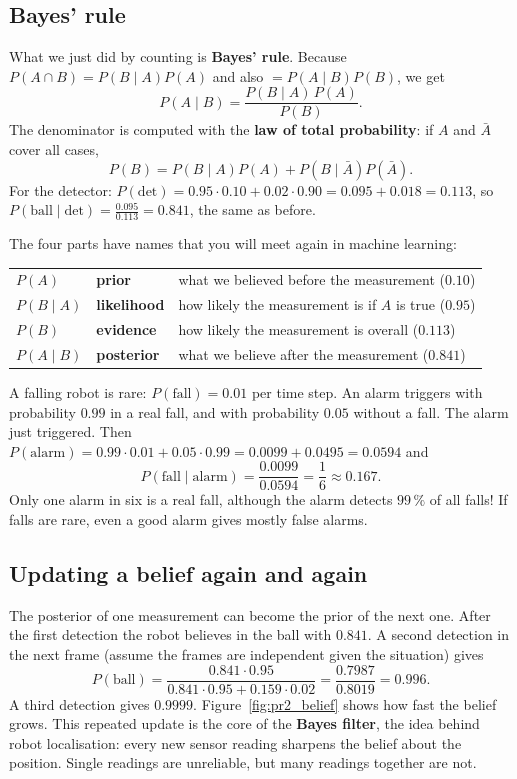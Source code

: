 \subsection*{Bayes' rule}
What we just did by counting is \textbf{Bayes' rule}. Because $P(A\cap B)=P(B\mid A)P(A)$ and also $=P(A\mid B)P(B)$, we get
\[
P(A\mid B)=\frac{P(B\mid A)\,P(A)}{P(B)}.
\]
The denominator is computed with the \textbf{law of total probability}: if $A$ and $\bar A$ cover all cases,
\[
P(B)=P(B\mid A)P(A)+P(B\mid\bar A)P(\bar A).
\]
For the detector: $P(\text{det})=0.95\cdot0.10+0.02\cdot0.90=0.095+0.018=0.113$, so $P(\text{ball}\mid\text{det})=\frac{0.095}{0.113}=0.841$, the same as before.

The four parts have names that you will meet again in machine learning:
\begin{center}
\renewcommand{\arraystretch}{1.25}
\begin{tabular}{lll}
$P(A)$ & \textbf{prior} & what we believed before the measurement ($0.10$)\\
$P(B\mid A)$ & \textbf{likelihood} & how likely the measurement is if $A$ is true ($0.95$)\\
$P(B)$ & \textbf{evidence} & how likely the measurement is overall ($0.113$)\\
$P(A\mid B)$ & \textbf{posterior} & what we believe after the measurement ($0.841$)\\
\end{tabular}
\end{center}

\begin{example}
A falling robot is rare: $P(\text{fall})=0.01$ per time step. An alarm triggers with probability $0.99$ in a real fall, and with probability $0.05$ without a fall. The alarm just triggered. Then $P(\text{alarm})=0.99\cdot0.01+0.05\cdot0.99=0.0099+0.0495=0.0594$ and
\[
P(\text{fall}\mid\text{alarm})=\frac{0.0099}{0.0594}=\frac16\approx0.167.
\]
Only one alarm in six is a real fall, although the alarm detects $99\,\%$ of all falls! If falls are rare, even a good alarm gives mostly false alarms.
\end{example}

\subsection*{Updating a belief again and again}
The posterior of one measurement can become the prior of the next one. After the first detection the robot believes in the ball with $0.841$. A second detection in the next frame (assume the frames are independent given the situation) gives
\[
P(\text{ball})=\frac{0.841\cdot0.95}{0.841\cdot0.95+0.159\cdot0.02}=\frac{0.7987}{0.8019}=0.996.
\]
A third detection gives $0.9999$. Figure~\ref{fig:pr2_belief} shows how fast the belief grows. This repeated update is the core of the \textbf{Bayes filter}, the idea behind robot localisation: every new sensor reading sharpens the belief about the position. Single readings are unreliable, but many readings together are not.

